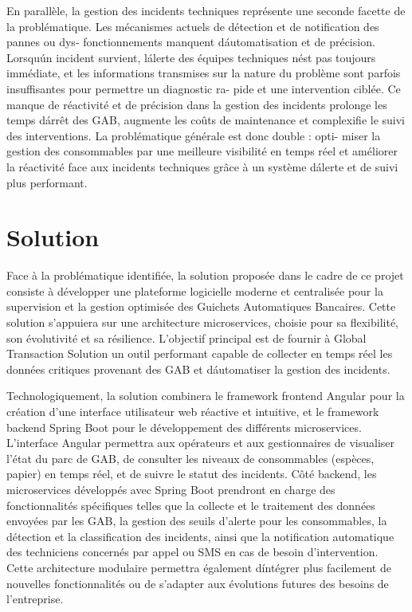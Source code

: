 \documentclass[a4paper,15pt]{report}
\begin{document}
	En parallèle, la gestion des incidents techniques représente une seconde facette de la
	problématique. Les mécanismes actuels de détection et de notification des pannes ou dys-
	fonctionnements manquent dáutomatisation et de précision. Lorsquún incident survient,
	lálerte des équipes techniques nést pas toujours immédiate, et les informations transmises
	sur la nature du problème sont parfois insuffisantes pour permettre un diagnostic ra-
	pide et une intervention ciblée. Ce manque de réactivité et de précision dans la gestion
	des incidents prolonge les temps dárrêt des GAB, augmente les coûts de maintenance et
	complexifie le suivi des interventions. La problématique générale est donc double : opti-
	miser la gestion des consommables par une meilleure visibilité en temps réel et améliorer
	la réactivité face aux incidents techniques grâce à un système dálerte et de suivi plus
	performant.
	
	

	\section{ Solution }
	\label{sec:solution}
	
	Face à la problématique identifiée, la solution proposée dans le cadre de ce projet consiste à développer une plateforme logicielle moderne et centralisée pour la supervision et la gestion optimisée des Guichets Automatiques Bancaires. Cette solution s'appuiera sur une architecture microservices, choisie pour sa flexibilité, son évolutivité et sa résilience. L'objectif principal est de fournir à Global Transaction Solution un outil performant capable de collecter en temps réel les données critiques provenant des GAB et d\'automatiser la gestion des incidents.
	
	Technologiquement, la solution combinera le framework frontend Angular pour la création d'une interface utilisateur web réactive et intuitive, et le framework backend Spring Boot pour le développement des différents microservices. L'interface Angular permettra aux opérateurs et aux gestionnaires de visualiser l'état du parc de GAB, de consulter les niveaux de consommables (espèces, papier) en temps réel, et de suivre le statut des incidents. Côté backend, les microservices développés avec Spring Boot prendront en charge des fonctionnalités spécifiques telles que la collecte et le traitement des données envoyées par les GAB, la gestion des seuils d'alerte pour les consommables, la détection et la classification des incidents, ainsi que la notification automatique des techniciens concernés par appel ou SMS en cas de besoin d'intervention. Cette architecture modulaire permettra également d\'intégrer plus facilement de nouvelles fonctionnalités ou de s'adapter aux évolutions futures des besoins de l'entreprise.
	
\end{document}
